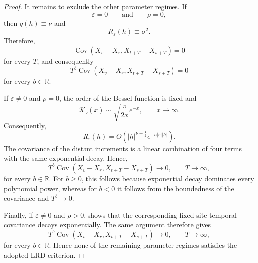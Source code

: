 \documentclass[preprint,12pt,authoryear]{elsarticle}
\begin{document}
\begin{proof}
It remains to exclude the other parameter regimes. If
\[
\varepsilon=0
\qquad\text{and}\qquad
\rho=0,
\]
then \(q(h)\equiv\nu\) and
\[
R_{\varepsilon}(h)\equiv\sigma^2.
\]
Therefore,
\[
\operatorname{Cov}
\left(
X_v-X_r,
X_{t+T}-X_{s+T}
\right)
=0
\]
for every \(T\), and consequently
\[
T^b
\operatorname{Cov}
\left(
X_v-X_r,
X_{t+T}-X_{s+T}
\right)
=0
\]
for every \(b\in\mathbb R\).

If \(\varepsilon\neq0\) and \(\rho=0\), the order of the Bessel function is fixed and
\[
\mathcal{K}_{\nu}(x)
\sim
\sqrt{\frac{\pi}{2x}}e^{-x},
\qquad x\to\infty.
\]
Consequently,
\[
R_{\varepsilon}(h)
=
O\!\left(
|h|^{\nu-\frac12}
e^{-a|\varepsilon||h|}
\right).
\]
The covariance of the distant increments is a linear combination of four terms with the same exponential decay. Hence,
\[
T^b
\operatorname{Cov}
\left(
X_v-X_r,
X_{t+T}-X_{s+T}
\right)
\longrightarrow0,
\qquad T\to\infty,
\]
for every \(b\in\mathbb R\). For \(b\geq0\), this follows because exponential decay dominates every polynomial power, whereas for \(b<0\) it follows from the boundedness of the covariance and \(T^b\to0\).

Finally, if \(\varepsilon\neq0\) and \(\rho>0\),
\citet[p.~315]{Stein2005} shows that the corresponding fixed-site temporal covariance decays exponentially. The same argument therefore gives
\[
T^b
\operatorname{Cov}
\left(
X_v-X_r,
X_{t+T}-X_{s+T}
\right)
\longrightarrow0,
\qquad T\to\infty,
\]
for every \(b\in\mathbb R\). Hence none of the remaining parameter regimes satisfies the adopted LRD criterion.
\end{proof}
\end{document}
